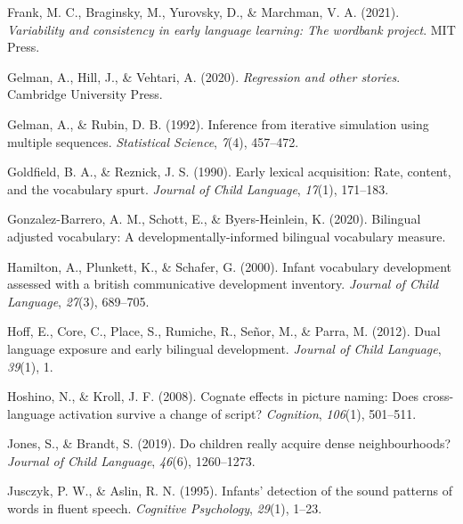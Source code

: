 \documentclass[
  english,
  man,man,floatsintext]{apa6}
\newlength{\cslhangindent}
\newenvironment{CSLReferences}[2] %
 {%
  \setlength{\parindent}{0pt}
  \ifodd #1 \everypar{\setlength{\hangindent}{\cslhangindent}}\ignorespaces\fi
  \ifnum #2 > 0
  \setlength{\parskip}{#2\baselineskip}
  \fi
 }%
 {}
\begin{document}
\begin{CSLReferences}{1}{0}
\leavevmode{}%
Frank, M. C., Braginsky, M., Yurovsky, D., \& Marchman, V. A. (2021). \emph{Variability and consistency in early language learning: The wordbank project}. MIT Press.

\leavevmode{}%
Gelman, A., Hill, J., \& Vehtari, A. (2020). \emph{Regression and other stories}. Cambridge University Press.

\leavevmode{}%
Gelman, A., \& Rubin, D. B. (1992). Inference from iterative simulation using multiple sequences. \emph{Statistical Science}, \emph{7}(4), 457--472.

\leavevmode{}%
Goldfield, B. A., \& Reznick, J. S. (1990). Early lexical acquisition: Rate, content, and the vocabulary spurt. \emph{Journal of Child Language}, \emph{17}(1), 171--183.

\leavevmode{}%
Gonzalez-Barrero, A. M., Schott, E., \& Byers-Heinlein, K. (2020). Bilingual adjusted vocabulary: A developmentally-informed bilingual vocabulary measure.

\leavevmode{}%
Hamilton, A., Plunkett, K., \& Schafer, G. (2000). Infant vocabulary development assessed with a british communicative development inventory. \emph{Journal of Child Language}, \emph{27}(3), 689--705.

\leavevmode{}%
Hoff, E., Core, C., Place, S., Rumiche, R., Señor, M., \& Parra, M. (2012). Dual language exposure and early bilingual development. \emph{Journal of Child Language}, \emph{39}(1), 1.

\leavevmode{}%
Hoshino, N., \& Kroll, J. F. (2008). Cognate effects in picture naming: Does cross-language activation survive a change of script? \emph{Cognition}, \emph{106}(1), 501--511.

\leavevmode{}%
Jones, S., \& Brandt, S. (2019). Do children really acquire dense neighbourhoods? \emph{Journal of Child Language}, \emph{46}(6), 1260--1273.

\leavevmode{}%
Jusczyk, P. W., \& Aslin, R. N. (1995). Infants' detection of the sound patterns of words in fluent speech. \emph{Cognitive Psychology}, \emph{29}(1), 1--23.


\end{CSLReferences}
\end{document}

